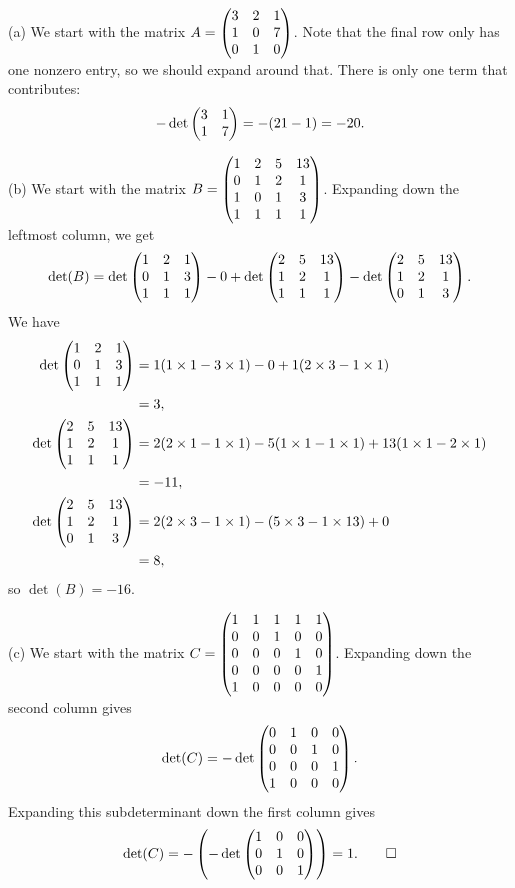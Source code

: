 \documentclass{article}
\begin{document}
\begin{Solution}\label{sol:exr:routine1}
(a) We start with the matrix \(A=\begin{pmatrix} 3 & 2 & 1 \\ 1 & 0 & 7 \\ 0 & 1
& 0\end{pmatrix}\). Note that the final row only has one nonzero entry, so we
should expand around that. There is only one term that contributes:
\[-\det\begin{pmatrix} 3 & 1 \\ 1 & 7\end{pmatrix}=-(21-1)=-20.\]


(b) We start with the matrix \(B=\begin{pmatrix} 1 & 2 & 5 & 13 \\ 0 & 1 & 2 & 1
\\ 1 & 0 & 1 & 3 \\ 1 & 1 & 1 & 1\end{pmatrix}\). Expanding down the leftmost
column, we get \[\det(B)=\det\begin{pmatrix} 1 & 2 & 1 \\ 0 & 1 & 3 \\ 1 & 1 &
1\end{pmatrix}-0+\det\begin{pmatrix} 2 & 5 & 13 \\ 1 & 2 & 1 \\ 1 & 1 & 1\end{pmatrix}-\det\begin{pmatrix} 2 & 5
& 13 \\ 1 & 2 & 1 \\ 0 & 1 & 3\end{pmatrix}.\] We have
\begin{align*}
\det\begin{pmatrix} 1 & 2 & 1 \\ 0 & 1 & 3 \\ 1 & 1 & 1\end{pmatrix}&=1(1\times 1-3\times 1)-0+1(2\times 3-1\times 1)\\
&=3,\\
\det\begin{pmatrix} 2 & 5 & 13 \\ 1 & 2 & 1 \\ 1 & 1 & 1\end{pmatrix}&=2(2\times 1-1\times 1)-5(1\times 1-1\times 1)+13(1\times 1-2\times 1)\\
&=-11,\\
\det\begin{pmatrix} 2 & 5 & 13 \\ 1 & 2 & 1 \\ 0 & 1 & 3\end{pmatrix}&=2(2\times 3-1\times 1)-(5\times 3-1\times 13)+0\\
&=8,\\
\end{align*}
so \(\det(B)=-16\).


(c) We start with the matrix \(C=\begin{pmatrix} 1 & 1 & 1 & 1 & 1 \\ 0 & 0 & 1
& 0 & 0 \\ 0 & 0 & 0 & 1 & 0 \\ 0 & 0 & 0 & 0 & 1 \\ 1 & 0 & 0 & 0 &
0\end{pmatrix}\). Expanding down the second column gives \[\det(C)=-\det\begin{pmatrix} 0
& 1 & 0 & 0 \\ 0 & 0 & 1 & 0 \\ 0 & 0 & 0 & 1 \\ 1 & 0 & 0 & 0\end{pmatrix}.\]
Expanding this subdeterminant down the first column gives
\[\det(C)=-\left(-\det\begin{pmatrix} 1 & 0 & 0 \\ 0 & 1 & 0 \\ 0 & 0 &
1\end{pmatrix}\right)=1. \qedhere\]


\end{Solution}
\end{document}
